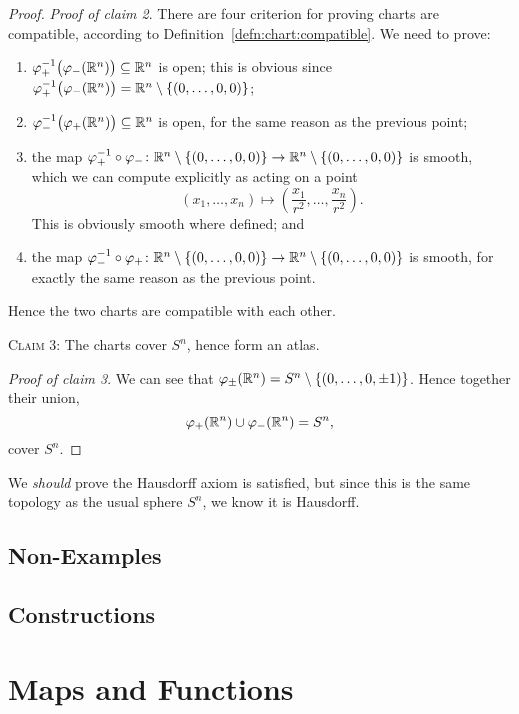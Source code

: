 \begin{proof}
\noindent\textit{Proof of claim 2}.
There are four criterion for proving charts are compatible, according to Definition~\ref{defn:chart:compatible}.
We need to prove:
\begin{enumerate}
\item $\varphi_{+}^{-1}\bigl(\varphi_{-}(\mathbb{R}^{n})\bigr)\subseteq\mathbb{R}^{n}$
  is open; this is obvious since $\varphi_{+}^{-1}\bigl(\varphi_{-}(\mathbb{R}^{n})\bigr)=\mathbb{R}^{n}\setminus\{(0,\dots,0,0)\}$;
\item $\varphi_{-}^{-1}\bigl(\varphi_{+}(\mathbb{R}^{n})\bigr)\subseteq\mathbb{R}^{n}$
  is open, for the same reason as the previous point;
\item the map $\varphi_{+}^{-1}\circ\varphi_{-}\colon\mathbb{R}^{n}\setminus\{(0,\dots,0,0)\}\to\mathbb{R}^{n}\setminus\{(0,\dots,0,0)\}$
  is smooth, which we can compute explicitly as acting on a point
  \begin{equation}
(x_{1},\dots,x_{n})\mapsto\left(\frac{x_{1}}{r^{2}},\dots,\frac{x_{n}}{r^{2}}\right).
  \end{equation}
  This is obviously smooth where defined; and
\item the map $\varphi_{-}^{-1}\circ\varphi_{+}\colon\mathbb{R}^{n}\setminus\{(0,\dots,0,0)\}\to\mathbb{R}^{n}\setminus\{(0,\dots,0,0)\}$
is smooth, for exactly the same reason as the previous point.
\end{enumerate}
Hence the two charts are compatible with each other.

\smallbreak
  \textsc{Claim 3:} The charts cover $S^{n}$, hence form an atlas.

\noindent\textit{Proof of claim 3}.  We can see that $\varphi_{\pm}(\mathbb{R}^{n})=S^{n}\setminus\{(0,\dots,0,\pm1)\}$.
  Hence together their union,
  \begin{equation}
\varphi_{+}(\mathbb{R}^{n})\cup\varphi_{-}(\mathbb{R}^{n}) = S^{n},
  \end{equation}
cover $S^{n}$.
\end{proof}

\begin{remark}
We \emph{should} prove the Hausdorff axiom is satisfied, but since this
is the same topology as the usual sphere $S^{n}$, we know it is Hausdorff.
\end{remark}

\subsection{Non-Examples}

\subsection{Constructions}

\section{Maps and Functions}
